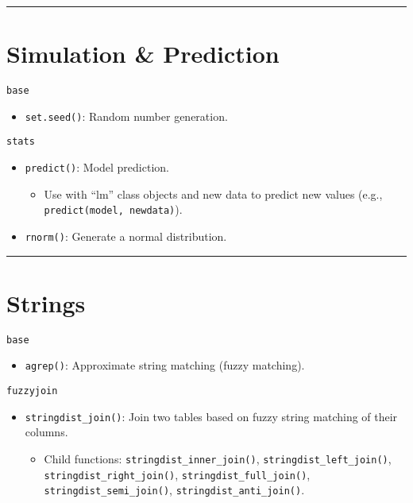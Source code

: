 \documentclass[]{book}
\providecommand{\tightlist}{%
  \setlength{\itemsep}{0pt}\setlength{\parskip}{0pt}}
\begin{document}
\begin{center}\rule{0.5\linewidth}{\linethickness}\end{center}

\hypertarget{simulation-prediction}{%
\section{Simulation \& Prediction}\label{simulation-prediction}}

\texttt{base}

\begin{itemize}
\tightlist
\item
  \texttt{set.seed()}: Random number generation.
\end{itemize}

\texttt{stats}

\begin{itemize}
\tightlist
\item
  \texttt{predict()}: Model prediction.

  \begin{itemize}
  \tightlist
  \item
    Use with ``lm'' class objects and new data to predict new values (e.g., \texttt{predict(model,\ newdata)}).
  \end{itemize}
\item
  \texttt{rnorm()}: Generate a normal distribution.
\end{itemize}

\begin{center}\rule{0.5\linewidth}{\linethickness}\end{center}

\hypertarget{strings-1}{%
\section{Strings}\label{strings-1}}

\texttt{base}

\begin{itemize}
\tightlist
\item
  \texttt{agrep()}: Approximate string matching (fuzzy matching).
\end{itemize}

\texttt{fuzzyjoin}

\begin{itemize}
\tightlist
\item
  \texttt{stringdist\_join()}: Join two tables based on fuzzy string matching of their columns.

  \begin{itemize}
  \tightlist
  \item
    Child functions: \texttt{stringdist\_inner\_join()}, \texttt{stringdist\_left\_join()}, \texttt{stringdist\_right\_join()}, \texttt{stringdist\_full\_join()}, \texttt{stringdist\_semi\_join()}, \texttt{stringdist\_anti\_join()}.
  \end{itemize}
\end{itemize}
\end{document}
